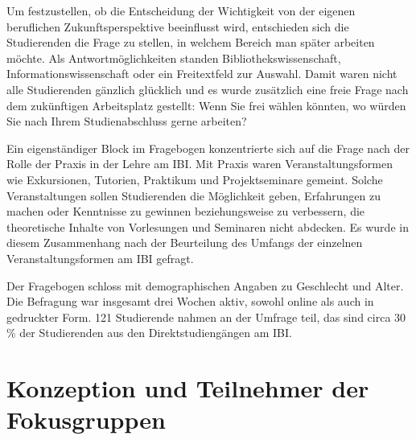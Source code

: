 \documentclass[a4paper,
fontsize=11pt,
oneside,
numbers=noperiodatend,
parskip=half-,
bibliography=totoc,
final
]{scrartcl}
\begin{document}
Um festzustellen, ob die Entscheidung der Wichtigkeit von der eigenen
beruflichen Zukunftsperspektive beeinflusst wird, entschieden sich die
Studierenden die Frage zu stellen, in welchem Bereich man später
arbeiten möchte. Als Antwortmöglichkeiten standen
Bibliothekswissenschaft, Informationswissenschaft oder ein Freitextfeld
zur Auswahl. Damit waren nicht alle Studierenden gänzlich glücklich und
es wurde zusätzlich eine freie Frage nach dem zukünftigen Arbeitsplatz
gestellt: Wenn Sie frei wählen könnten, wo würden Sie nach Ihrem
Studienabschluss gerne arbeiten?

Ein eigenständiger Block im Fragebogen konzentrierte sich auf die Frage
nach der Rolle der Praxis in der Lehre am IBI. Mit Praxis waren
Veranstaltungsformen wie Exkursionen, Tutorien, Praktikum und
Projektseminare gemeint. Solche Veranstaltungen sollen Studierenden die
Möglichkeit geben, Erfahrungen zu machen oder Kenntnisse zu gewinnen
beziehungsweise zu verbessern, die theoretische Inhalte von Vorlesungen
und Seminaren nicht abdecken. Es wurde in diesem Zusammenhang nach der
Beurteilung des Umfangs der einzelnen Veranstaltungsformen am IBI
gefragt.

Der Fragebogen schloss mit demographischen Angaben zu Geschlecht und
Alter. Die Befragung war insgesamt drei Wochen aktiv, sowohl online als
auch in gedruckter Form. 121 Studierende nahmen an der Umfrage teil, das
sind circa 30\,\% der Studierenden aus den Direktstudiengängen am IBI.

\hypertarget{konzeption-und-teilnehmer-der-fokusgruppen}{%
\section{Konzeption und Teilnehmer der
Fokusgruppen}\label{konzeption-und-teilnehmer-der-fokusgruppen}}
\end{document}
